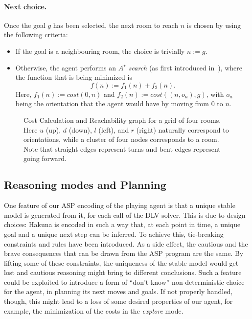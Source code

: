 \documentclass{llncs}
\begin{document}
\paragraph{Next choice.} Once the goal $g$ has been selected, the next room to reach $n$ is chosen by using the following criteria:
\begin{itemize}
	\item If the goal is a neighbouring room, the choice is trivially $n := g$.
	\item Otherwise, the agent performs an \emph{$A^{\star}$ search} (as first introduced in~\cite{AStar}), where the function that is being minimized is
	$$
	f(n) := f_1(n) + f_2(n).
	$$
	Here, $f_1(n) := cost(0,n)$ and $f_2(n) := cost((n,o_n),g)$, with $o_n$ being the orientation that the agent would have by moving from $0$ to $n$.
\end{itemize}

\begin{figure}
	\begin{center}
		
	\end{center}
	\caption[Cost Calculation and Reachability graph]{Cost Calculation and Reachability graph for a grid of four rooms. Here $u$ (up), $d$ (down), $l$ (left), and $r$ (right) naturally correspond to orientations, while a cluster of four nodes corresponds to a room. Note that straight edges represent turns and bent edges represent going forward.}
	\label{fig:graph}
\end{figure}

\subsection{Reasoning modes and Planning}

One feature of our ASP encoding of the playing agent is that a unique stable model is generated from it, for each call of the DLV solver.
This is due to design choices: Hakuna is encoded in such a way that, at each point in time, a unique goal and a unique next step can be inferred.
To achieve this, tie-breaking constraints and rules have been introduced.
As a side effect, the cautious and the brave consequences that can be drawn from the ASP program are the same.
By lifting some of these constraints, the uniqueness of the stable model would get lost and cautious reasoning might bring to different conclusions.
Such a feature could be exploited to introduce a form of ``don't know'' non-deterministic choice for the agent, in planning its next moves and goals.
If not properly handled, though, this might lead to a loss of some desired properties of our agent, for example, the minimization of the costs in the \emph{explore} mode.
\end{document}
